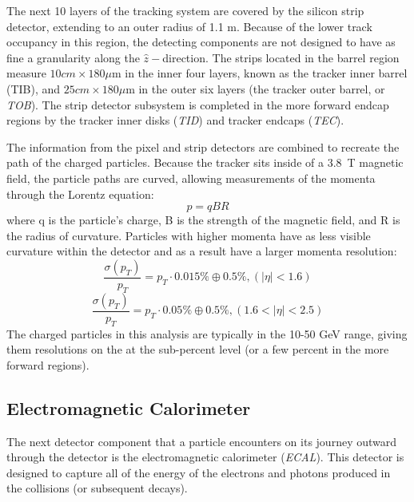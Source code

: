 The next 10 layers of the tracking system are covered by the silicon strip
detector, extending to an outer radius of 1.1 m. Because of the lower track
occupancy in this region, the detecting components are not designed to have as
fine a granularity along the $\hat z-$direction.
The strips located in the barrel region  measure $10 cm \times 180 \mu$m in the
inner four layers, known as the tracker inner barrel (TIB), and $25 cm \times
180 \mu $m in the outer six layers (the tracker outer barrel, or \emph{TOB}).
The strip detector subsystem is completed in the more forward endcap regions by
the tracker inner disks (\emph{TID}) and tracker endcaps (\emph{TEC}). 

The information from the pixel and strip detectors are combined to recreate the
path of the charged particles. Because the tracker sits inside of a 3.8~T
magnetic field, the particle paths are curved, allowing measurements of the
momenta through the Lorentz equation:
\begin{equation}
    p = q B R
\end{equation}
where q is the particle's charge, B is the strength of the magnetic field, and R
is the radius of curvature. Particles with higher momenta have as less visible
curvature within the detector and as a result have a larger momenta resolution:
\begin{equation}
    \frac{\sigma(p_T)}{p_T} = p_T \cdot 0.015\% \oplus 0.5\%,  (|\eta|<1.6)
\end{equation}
\begin{equation}
    \frac{\sigma(p_T)}{p_T} = p_T \cdot 0.05\% \oplus 0.5\%,  (1.6 < |\eta| < 2.5)
\end{equation}
The charged particles in this analysis are typically in the 10-50 GeV range,
giving them resolutions on the at the sub-percent level (or a few percent in the
more forward regions).

\subsection{Electromagnetic Calorimeter}
The next detector component that a particle encounters on its journey outward
through the detector is the electromagnetic calorimeter (\emph{ECAL}). This detector is
designed to capture all of the energy of the electrons and photons produced in
the collisions (or subsequent decays). 

